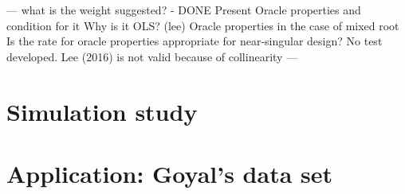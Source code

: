 \documentclass[12pt,a4paper]{article}
\begin{document}
--- what is the weight suggested? - DONE 
Present Oracle properties and condition for it
Why is it OLS? (lee) 
Oracle properties in the case of mixed root
Is the rate for oracle properties appropriate for near-singular design?
No test developed. Lee (2016) is not valid because of collinearity ---




\section{Simulation study}

\section{Application: Goyal's data set}



\end{document}
